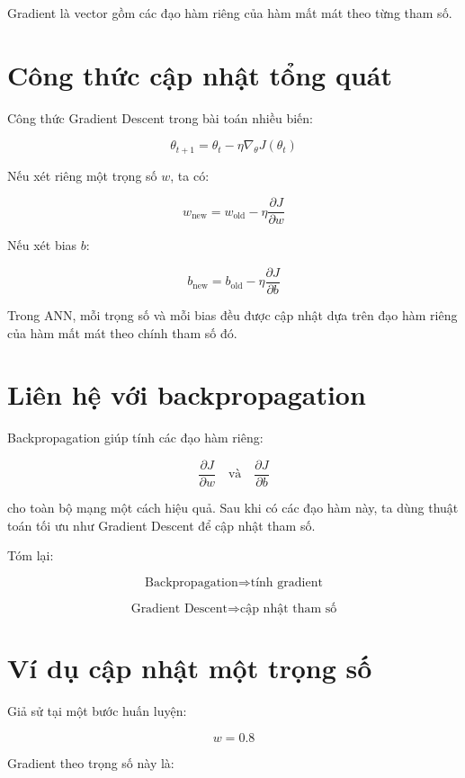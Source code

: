 \documentclass[12pt,a4paper]{report}
\begin{document}
Gradient là vector gồm các đạo hàm riêng của hàm mất mát theo từng tham số.

\section{Công thức cập nhật tổng quát}

Công thức Gradient Descent trong bài toán nhiều biến:

\[
    \theta_{t+1}
    =
    \theta_t
    -
    \eta \nabla_{\theta}J(\theta_t)
\]

Nếu xét riêng một trọng số $w$, ta có:

\[
    w_{\text{new}}
    =
    w_{\text{old}}
    -
    \eta
    \frac{\partial J}{\partial w}
\]

Nếu xét bias $b$:

\[
    b_{\text{new}}
    =
    b_{\text{old}}
    -
    \eta
    \frac{\partial J}{\partial b}
\]

\begin{ghinho}
Trong ANN, mỗi trọng số và mỗi bias đều được cập nhật dựa trên đạo hàm riêng của hàm mất mát theo chính tham số đó.
\end{ghinho}

\section{Liên hệ với backpropagation}

Backpropagation giúp tính các đạo hàm riêng:

\[
    \frac{\partial J}{\partial w}
    \quad \text{và} \quad
    \frac{\partial J}{\partial b}
\]

cho toàn bộ mạng một cách hiệu quả. Sau khi có các đạo hàm này, ta dùng thuật toán tối ưu như Gradient Descent để cập nhật tham số.

Tóm lại:

\[
    \text{Backpropagation} \Rightarrow \text{tính gradient}
\]

\[
    \text{Gradient Descent} \Rightarrow \text{cập nhật tham số}
\]

\section{Ví dụ cập nhật một trọng số}

Giả sử tại một bước huấn luyện:

\[
    w = 0.8
\]

Gradient theo trọng số này là:
\end{document}
